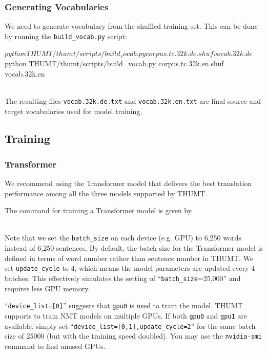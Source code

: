\documentclass{article}
\begin{document}
\subsubsection{Generating Vocabularies}
We need to generate vocabulary from the shuffled training set. This can be done by running the \verb|build_vocab.py| script:
\\
\begin{everbatim}
$ python THUMT/thumt/scripts/build_vocab.py corpus.tc.32k.de.shuf
vocab.32k.de
$ python THUMT/thumt/scripts/build_vocab.py corpus.tc.32k.en.shuf
vocab.32k.en
\end{everbatim}
\\
The resulting files \verb|vocab.32k.de.txt| and \verb|vocab.32k.en.txt| are final source and target vocabularies used for model training.

\subsection{Training}

\subsubsection{Transformer}
We recommend using the Transformer model that delivers the best translation performance among all the three models supported by THUMT.

The command for training a Transformer model is given by
\\
\\
Note that we set the \verb|batch_size| on each device (e.g. GPU) to 6,250 words instead of 6,250 sentences. By default, the batch size for the Transformer model is defined in terms of word number rather than sentence number in THUMT. We set \verb|update_cycle| to 4, which means the model parameters are updated every 4 batches. This effectively simulates the setting of ``\verb|batch_size|=25,000'' and requires less GPU memory.

``\verb|device_list=[0]|'' suggests that \verb|gpu0| is used to train the model. THUMT supports to train NMT models on multiple GPUs. If both \verb|gpu0| and \verb|gpu1| are available, simply set ``\verb|device_list=[0,1],update_cycle=2|'' for the same batch size of 25000 (but with the training speed doubled). You may use the \verb|nvidia-smi| command to find unused GPUs.
\end{document}
